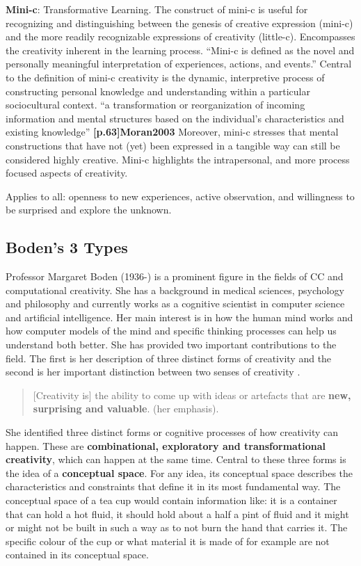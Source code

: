 \textbf{Mini-c}: Transformative Learning. The construct of mini-c is useful for recognizing and distinguishing between the genesis of creative expression (mini-c) and the more readily recognizable expressions of creativity (little-c). Encompasses the creativity inherent in the learning process. ``Mini-c is defined as the novel and personally meaningful interpretation of experiences, actions, and events.'' \citep{Beghetto2007} Central to the definition of mini-c creativity is the dynamic, interpretive process of constructing personal knowledge and understanding within a particular sociocultural context. ``a transformation or reorganization of incoming information and mental structures based on the individual's characteristics and existing knowledge'' \textbf{[p.63]Moran2003} Moreover, mini-c stresses that mental constructions that have not (yet) been expressed in a tangible way can still be considered highly creative. Mini-c highlights the intrapersonal, and more process focused aspects of creativity.

Applies to all: openness to new experiences, active observation, and willingness to be surprised and explore the unknown.

\subsection{Boden's 3 Types}

Professor Margaret Boden (1936-) is a prominent figure in the fields of CC and computational creativity. She has a background in medical sciences, psychology and philosophy and currently works as a cognitive scientist in computer science and artificial intelligence. Her main interest is in how the human mind works and how computer models of the mind and specific thinking processes can help us understand both better. She has provided two important contributions to the field. The first is her description of three distinct forms of creativity and the second is her important distinction between two senses of creativity \citep{Boden2003}.

\begin{quote}
  [Creativity is] the ability to come up with ideas or artefacts that are \textbf{new, surprising and valuable}. \citep{Boden2003} (her emphasis).
\end{quote}

She identified three distinct forms or cognitive processes of how creativity can happen. These are \textbf{combinational, exploratory and transformational creativity}, which can happen at the same time. Central to these three forms is the idea of a \textbf{conceptual space}. For any idea, its conceptual space describes the characteristics and constraints that define it in its most fundamental way. The conceptual space of a tea cup would contain information like: it is a container that can hold a hot fluid, it should hold about a half a pint of fluid and it might or might not be built in such a way as to not burn the hand that carries it. The specific colour of the cup or what material it is made of for example are not contained in its conceptual space.


